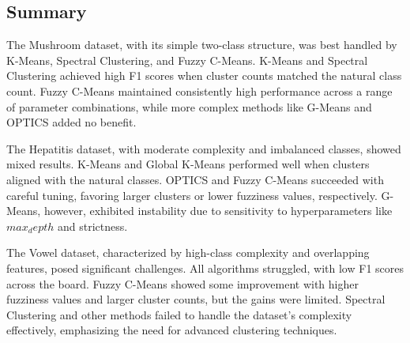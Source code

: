 \subsection{Summary}
\label{subsec:resultssummary}

The Mushroom dataset, with its simple two-class structure, was best handled by K-Means,
Spectral Clustering, and Fuzzy C-Means. K-Means and Spectral Clustering achieved high F1 
scores when cluster counts matched the natural class count. Fuzzy C-Means maintained 
consistently high performance across a range of parameter combinations, while more complex 
methods like G-Means and OPTICS added no benefit.

The Hepatitis dataset, with moderate complexity and imbalanced classes, showed mixed results.
K-Means and Global K-Means performed well when clusters aligned with the natural classes. 
OPTICS and Fuzzy C-Means succeeded with careful tuning, favoring larger clusters or 
lower fuzziness values, respectively. G-Means, however, exhibited instability due 
to sensitivity to hyperparameters like $max_depth$ and strictness.

The Vowel dataset, characterized by high-class complexity and overlapping 
features, posed significant challenges. All algorithms struggled, with low F1 
scores across the board. Fuzzy C-Means showed some improvement with higher fuzziness 
values and larger cluster counts, but the gains were limited. Spectral Clustering 
and other methods failed to handle the dataset's complexity effectively, emphasizing the need for advanced clustering techniques.